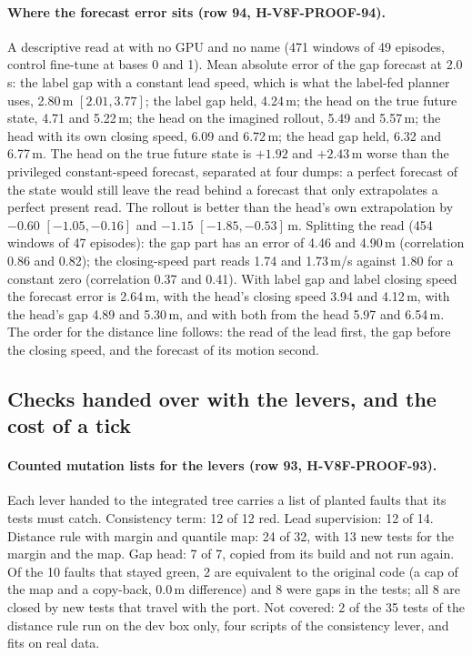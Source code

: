 \paragraph{Where the forecast error sits (row 94, H-V8F-PROOF-94).} A descriptive read at  with no GPU and no name (471 windows of 49 episodes, control fine-tune at bases 0 and 1). Mean absolute error of the gap forecast at 2.0\,s: the label gap with a constant lead speed, which is what the label-fed planner uses, 2.80\,m $[2.01,3.77]$; the label gap held, 4.24\,m; the head on the true future state, 4.71 and 5.22\,m; the head on the imagined rollout, 5.49 and 5.57\,m; the head with its own closing speed, 6.09 and 6.72\,m; the head gap held, 6.32 and 6.77\,m. The head on the true future state is $+1.92$ and $+2.43$\,m worse than the privileged constant-speed forecast, separated at four dumps: a perfect forecast of the state would still leave the read behind a forecast that only extrapolates a perfect present read. The rollout is better than the head's own extrapolation by $-0.60$ $[-1.05,-0.16]$ and $-1.15$ $[-1.85,-0.53]$\,m. Splitting the read (454 windows of 47 episodes): the gap part has an error of 4.46 and 4.90\,m (correlation 0.86 and 0.82); the closing-speed part reads 1.74 and 1.73\,m/s against 1.80 for a constant zero (correlation 0.37 and 0.41). With label gap and label closing speed the forecast error is 2.64\,m, with the head's closing speed 3.94 and 4.12\,m, with the head's gap 4.89 and 5.30\,m, and with both from the head 5.97 and 6.54\,m. The order for the distance line follows: the read of the lead first, the gap before the closing speed, and the forecast of its motion second.



\subsection{Checks handed over with the levers, and the cost of a tick}\label{sec:handover}
\paragraph{Counted mutation lists for the levers (row 93, H-V8F-PROOF-93).} Each lever handed to the integrated tree carries a list of planted faults that its tests must catch. Consistency term: 12 of 12 red. Lead supervision: 12 of 14. Distance rule with margin and quantile map: 24 of 32, with 13 new tests for the margin and the map. Gap head: 7 of 7, copied from its build and not run again. Of the 10 faults that stayed green, 2 are equivalent to the original code (a cap of the map and a copy-back, 0.0\,m difference) and 8 were gaps in the tests; all 8 are closed by new tests that travel with the port. Not covered: 2 of the 35 tests of the distance rule run on the dev box only, four scripts of the consistency lever, and fits on real data.

